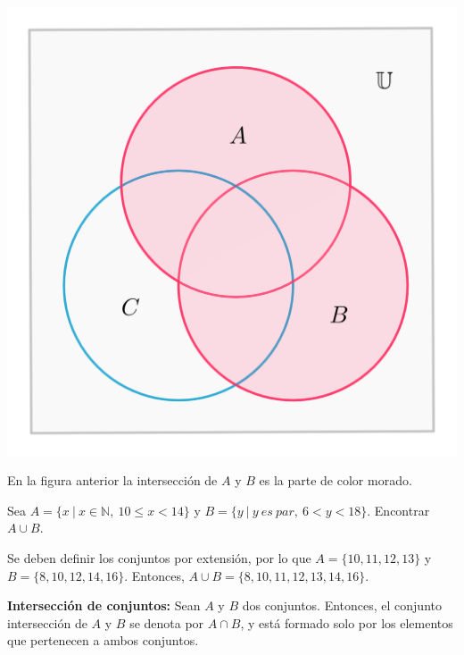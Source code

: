 \begin{center}
    \includegraphics[scale=0.7]{Imagenes/IMG1/S1-1-02.png}
\end{center}

En la figura anterior la intersección de $A$ y $B$ es la parte de color morado.

\begin{ejemplo}
    Sea $A=\{x \ | \ x \in \mathbb{N}, \ 10 \leq x < 14\}$ y $B=\{y \ | \ y \ es \ par, \ 6<y<18\}$. Encontrar $A \cup B$.
\end{ejemplo}

\begin{solucion}
    Se deben definir los conjuntos por extensión, por lo que $A=\{10,11,12,13\}$ y $B=\{8,10,12,14,16\}$.  Entonces, $A \cup B=\{8,10,11,12,13,14,16\}$.
\end{solucion}

\textbf{Intersección de conjuntos:} Sean $A$ y $B$ dos conjuntos. Entonces, el conjunto intersección de $A$ y $B$ se denota por $A \cap B$, y está formado solo por los elementos que pertenecen a ambos conjuntos. 

